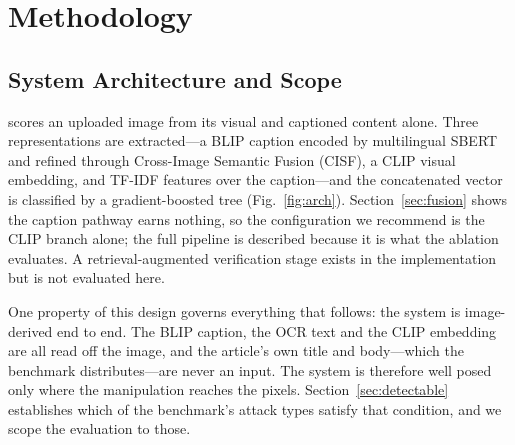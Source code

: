 %
%
%

\section{Methodology}

\subsection{System Architecture and Scope}
\label{sec:scope}

\sysname{} scores an uploaded image from its visual and captioned content
alone. Three representations are extracted---a BLIP caption encoded by
multilingual SBERT and refined through Cross-Image Semantic Fusion (CISF), a
CLIP visual embedding, and TF-IDF features over the caption---and the
concatenated vector is classified by a gradient-boosted tree
(Fig.~\ref{fig:arch}). Section~\ref{sec:fusion} shows the caption pathway earns
nothing, so the configuration we recommend is the CLIP branch alone; the full
pipeline is described because it is what the ablation evaluates. A
retrieval-augmented verification stage exists in the implementation but is not
evaluated here.

One property of this design governs everything that follows: the system is
image-derived end to end. The BLIP caption, the OCR text and the CLIP embedding
are all read off the image, and the article's own title and body---which the
benchmark distributes---are never an input. The system is therefore well posed
only where the manipulation reaches the pixels. Section~\ref{sec:detectable}
establishes which of the benchmark's attack types satisfy that condition, and
we scope the evaluation to those.

